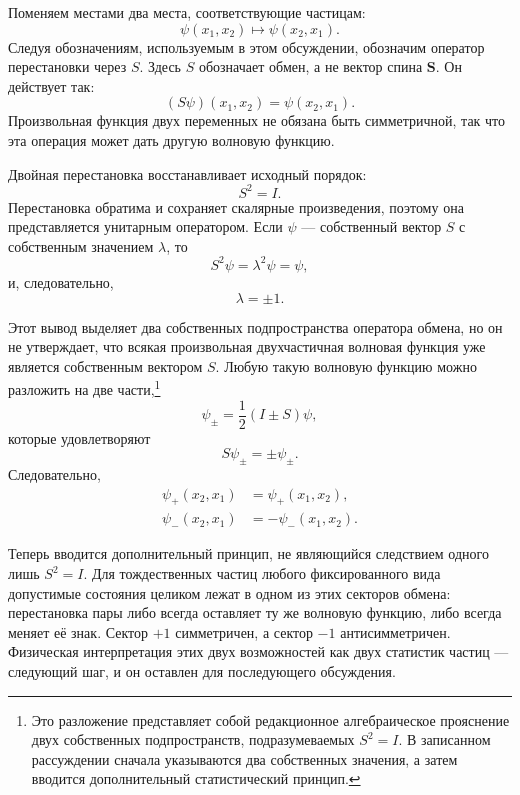 Поменяем местами два места, соответствующие частицам:
\begin{equation}
\psi(x_{1},x_{2})\longmapsto\psi(x_{2},x_{1}).
\end{equation}
Следуя обозначениям, используемым в этом обсуждении, обозначим оператор перестановки через \(S\). Здесь \(S\) обозначает обмен, а не вектор спина \(\mathbf S\). Он действует так:
\begin{equation}
(S\psi)(x_{1},x_{2})=\psi(x_{2},x_{1}).
\end{equation}
Произвольная функция двух переменных не обязана быть симметричной, так что эта операция может дать другую волновую функцию.

Двойная перестановка восстанавливает исходный порядок:
\begin{equation}
S^{2}=I.
\end{equation}
Перестановка обратима и сохраняет скалярные произведения, поэтому она представляется унитарным оператором. Если \(\psi\) — собственный вектор \(S\) с собственным значением \(\lambda\), то
\[
S^{2}\psi=\lambda^{2}\psi=\psi,
\]
и, следовательно,
\begin{equation}
\lambda=\pm1.
\end{equation}

Этот вывод выделяет два собственных подпространства оператора обмена, но он не утверждает, что всякая произвольная двухчастичная волновая функция уже является собственным вектором \(S\). Любую такую волновую функцию можно разложить на две части,\footnote{Это разложение представляет собой редакционное алгебраическое прояснение двух собственных подпространств, подразумеваемых \(S^{2}=I\). В записанном рассуждении сначала указываются два собственных значения, а затем вводится дополнительный статистический принцип.}
\begin{equation}
\psi_{\pm}=\frac12(I\pm S)\psi,
\end{equation}
которые удовлетворяют
\begin{equation}
S\psi_{\pm}=\pm\psi_{\pm}.
\end{equation}
Следовательно,
\begin{align}
\psi_{+}(x_{2},x_{1})&=\psi_{+}(x_{1},x_{2}),\\
\psi_{-}(x_{2},x_{1})&=-\psi_{-}(x_{1},x_{2}).
\end{align}

Теперь вводится дополнительный принцип, не являющийся следствием одного лишь \(S^{2}=I\). Для тождественных частиц любого фиксированного вида допустимые состояния целиком лежат в одном из этих секторов обмена: перестановка пары либо всегда оставляет ту же волновую функцию, либо всегда меняет её знак. Сектор \(+1\) симметричен, а сектор \(-1\) антисимметричен. Физическая интерпретация этих двух возможностей как двух статистик частиц — следующий шаг, и он оставлен для последующего обсуждения.
